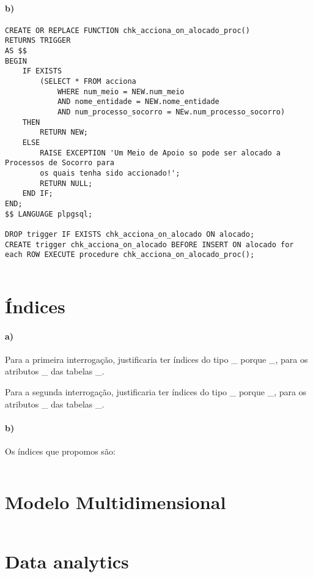 \documentclass[10pt,a4paper]{article}
\begin{document}
\paragraph{b)}
\begin{verbatim}
CREATE OR REPLACE FUNCTION chk_acciona_on_alocado_proc()
RETURNS TRIGGER
AS $$
BEGIN
    IF EXISTS
        (SELECT * FROM acciona
            WHERE num_meio = NEW.num_meio
            AND nome_entidade = NEW.nome_entidade
            AND num_processo_socorro = NEw.num_processo_socorro)
    THEN
        RETURN NEW;
    ELSE
        RAISE EXCEPTION 'Um Meio de Apoio so pode ser alocado a Processos de Socorro para
        os quais tenha sido accionado!';
        RETURN NULL;
    END IF;
END;
$$ LANGUAGE plpgsql;

DROP trigger IF EXISTS chk_acciona_on_alocado ON alocado;
CREATE trigger chk_acciona_on_alocado BEFORE INSERT ON alocado for each ROW EXECUTE procedure chk_acciona_on_alocado_proc();
    
\end{verbatim}
\section{Índices}

\paragraph{a)}
Para a primeira interrogação, justificaria ter índices do tipo \_ porque \_, para os atributos \_ das tabelas \_.

Para a segunda interrogação, justificaria ter índices do tipo \_ porque \_, para os atributos \_ das tabelas \_.
\paragraph{b)}
Os índices que propomos são:
\begin{verbatim}
\end{verbatim}

\section{Modelo Multidimensional}
\begin{verbatim}
\end{verbatim}


\section{Data analytics}
\begin{verbatim}
\end{verbatim}
\end{document}
